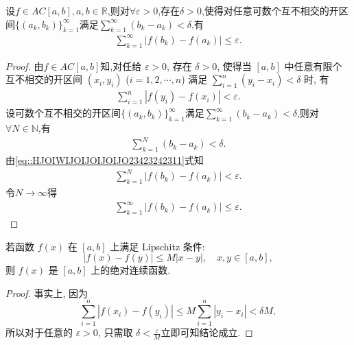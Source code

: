 \documentclass[../../main.tex]{subfiles}%
\begin{document}
\begin{proposition}\label{proposition:绝对连续函数对至多可数个开区间也成立}
设$f\in AC[a,b],a,b\in \mathbb{R}$,则对$\forall \varepsilon >0$,存在$\delta>0$,使得对任意可数个互不相交的开区间$\{(a_k,b_k)\}_{k=1}^{\infty}$满足$\sum\limits_{k=1}^{\infty}(b_k-a_k)<\delta$,有
\begin{align*}
\sum\limits_{k=1}^{\infty}\left|f(b_k)-f(a_k)\right|\leqslant \varepsilon .
\end{align*}
\end{proposition}
\begin{proof}
由$f\in AC[a,b]$知,对任给 $\varepsilon>0$, 存在 $\delta>0$, 使得当 $[a,b]$ 中任意有限个互不相交的开区间 $(x_i,y_i)$ ($i=1,2,\cdots,n$) 满足 $\sum_{i=1}^n (y_i-x_i) < \delta$ 时, 有
\begin{align}\label{eq::HJOIWIJOIJOIJOIJO23423242311}
\sum_{i=1}^n |f(y_i)-f(x_i)| < \varepsilon.
\end{align}
设可数个互不相交的开区间$\{(a_k,b_k)\}_{k=1}^{\infty}$满足$\sum\limits_{k=1}^{\infty}(b_k-a_k)<\delta$,则对$\forall N \in \mathbb{N}$,有
\begin{align*}
\sum\limits_{k=1}^{N}(b_k-a_k)<\delta.
\end{align*}
由\eqref{eq::HJOIWIJOIJOIJOIJO23423242311}式知
\begin{align*}
\sum_{k=1}^N |f(b_k)-f(a_k)| < \varepsilon.
\end{align*}
令$N\to \infty$得
\begin{align*}
\sum\limits_{k=1}^{\infty}\left|f(b_k)-f(a_k)\right|\leqslant \varepsilon .
\end{align*}
\end{proof}

\begin{proposition}\label{proposition:Lipschitz连续一定绝对连续}
若函数 $f(x)$ 在 $[a,b]$ 上满足 Lipschitz 条件:
\[
|f(x)-f(y)| \leqslant M|x-y|,\quad x,y\in[a,b],
\]
则 $f(x)$ 是 $[a,b]$ 上的绝对连续函数. 
\end{proposition}
\begin{proof}
事实上, 因为
\[
\sum_{i=1}^n |f(x_i)-f(y_i)| \leqslant M\sum_{i=1}^n |y_i-x_i| < \delta M,
\]
所以对于任意的 $\varepsilon>0$, 只需取 $\delta<\frac{\varepsilon}{M}$立即可知结论成立.
\end{proof}
\end{document}
